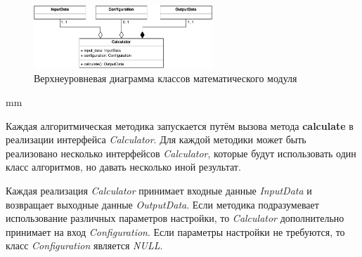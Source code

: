 \begin{figure}[H]
	\hspace*{-2.5 cm}\includegraphics[width=0.6\textwidth, left]{architecture/pictures/math/classes}
	\caption{Верхнеуровневая диаграмма классов математического модуля}
	\label{pic:architecture__math-classes}
\end{figure}
 mm

Каждая алгоритмическая методика запускается путём вызова метода \textbf{calculate}
в реализации интерфейса \textit{Calculator}.
Для каждой методики может быть реализовано несколько интерфейсов \textit{Calculator},
которые будут использовать один класс алгоритмов, но давать несколько иной результат.

Каждая реализация \textit{Calculator} принимает входные данные \textit{InputData} и возвращает выходные данные \textit{OutputData}.
Если методика подразумевает использование различных параметров настройки, то \textit{Calculator} дополнительно
принимает на вход \textit{Configuration}. Если параметры настройки не требуются, то класс \textit{Configuration}
является \textit{NULL}.
